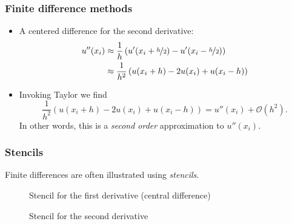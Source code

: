 \begin{frame}
  \frametitle{Finite difference methods}
  \begin{itemize}
  \item A centered difference for the second derivative:
    \begin{align*}
      u''(x_i) &\approx \frac{1}{h}\left( u'(x_i + \nicefrac{h}{2}) - u'(x_i - \nicefrac{h}{2})\right) \\
      &\approx \frac{1}{h^2}\left( u(x_i + h) - 2u(x_i) + u(x_i - h) \right)
    \end{align*}
  \item Invoking Taylor we find
    \[
      \frac{1}{h^2}\left( u(x_i + h) - 2u(x_i) + u(x_i - h) \right)
      = u''(x_i) + \mathcal{O}(h^2).
    \]
    In other words, this is a \emph{second order} approximation to $u''(x_i)$.
  \end{itemize}
\end{frame}

\begin{frame}
  \frametitle{Stencils}
  Finite differences are often illustrated using \emph{stencils}.
  \begin{figure}
    \begin{center}
      
    \end{center}
    \caption{Stencil for the first derivative (central difference)}
  \end{figure}
  \begin{figure}
    \begin{center}
      
    \end{center}
    \caption{Stencil for the second derivative}
  \end{figure}
\end{frame}

